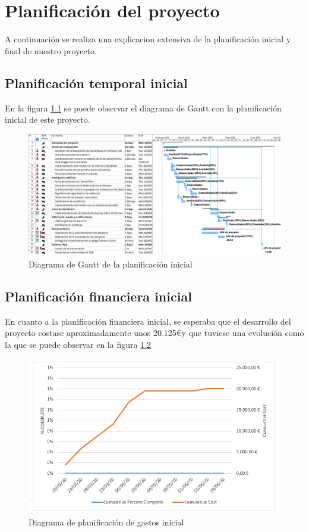 \chapter{Planificación del proyecto}\label{capPlanificacion}
A continuación se realiza una explicacion extensiva de la planificación inicial y final de nuestro proyecto.





\section{Planificación temporal inicial}\label{sec:planTemporalInicial}

En la figura \ref{fig:ganttInicial} se puede observar el diagrama de Gantt con la planificación inicial de este proyecto.
\begin{figure}[h!]
    \centering
    \includegraphics[width=0.9\linewidth]{img/Inicial/gantt-inicial.png}
    \caption{Diagrama de Gantt de la planificación inicial}
    \label{fig:ganttInicial}    
\end{figure}

\section{Planificación financiera inicial}\label{sec:planFinancieroInicial}
En cuanto a la planificación financiera inicial, se esperaba que el desarrollo del proyecto costase aproximadamente unos 20.125\euro y que tuviese una evolución como la que se puede observar en la figura \ref{fig:gastosInicial}
\begin{figure}[h!]
    \centering
    \includegraphics[width=0.7\linewidth]{img/Inicial/costes.PNG}
    \caption{Diagrama de planificación de gastos inicial}
    \label{fig:gastosInicial}    
\end{figure}


